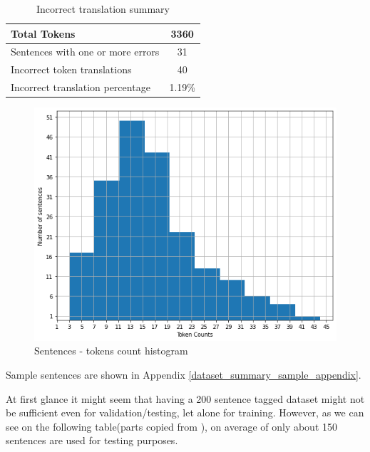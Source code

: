\begin{table}
    \begin{center}
        \begin{tabular}{|l|c|}
            \hline
            Total Tokens & 3360 \\
            \hline
            Sentences with one or more errors & 31 \\
            \hline
            Incorrect token translations & 40 \\
            \hline
            Incorrect translation percentage & 1.19\% \\
            \hline
        \end{tabular}
        \caption{Incorrect translation summary}
        \label{table:incorrect_summary}
    \end{center}
\end{table}

\begin{figure}[!h]
    \center
    \includegraphics[scale=0.3]{images/dataset_histogram}
    \caption{Sentences - tokens count histogram}
    \label{tokens_count_histogram}
\end{figure}
Sample sentences are shown in Appendix \ref{dataset_summary_sample_appendix}.
\newpage

At first glance it might seem that having a 200 sentence tagged dataset might
not be sufficient even for validation/testing, let alone for training. However,
as we can see on the following table(parts copied from \cite{udapter}), on
average of only about 150 sentences are used for testing purposes.

